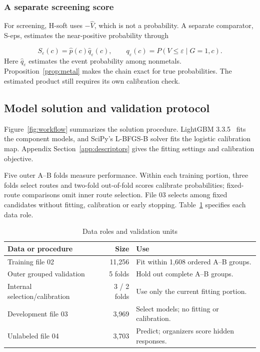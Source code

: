 \subsubsection{A separate screening score}
For screening, H-soft uses $-\widehat V$, which is not a probability. A separate comparator, S-eps, estimates the near-positive probability through
\begin{samepage}
\begin{equation}
 S_{\varepsilon}(c)=\widehat p(c)\widehat q_{\varepsilon}(c),
 \qquad q_{\varepsilon}(c)=P(V\le\varepsilon\mid G=1,c).
 \label{eq:chain}
\end{equation}
\noindent Here $\widehat q_{\varepsilon}$ estimates the event probability among nonmetals. Proposition~\ref{prop:metal} makes the chain exact for true probabilities. The estimated product still requires its own calibration check.
\end{samepage}

\subsection{Model solution and validation protocol}
Figure~\ref{fig:workflow} summarizes the solution procedure. LightGBM 3.3.5~\cite{ke2017} fits the component models, and SciPy's L-BFGS-B solver fits the logistic calibration map. Appendix Section~\ref{app:descriptors} gives the fitting settings and calibration objective.
\FloatBarrier

Five outer A--B folds measure performance. Within each training portion, three folds select routes and two-fold out-of-fold scores calibrate probabilities; fixed-route comparisons omit inner route selection. File 03 selects among fixed candidates without fitting, calibration or early stopping. Table~\ref{tab:protocol} specifies each data role.

\par
\begin{table}[H]
\centering
\begin{threeparttable}
\caption{Data roles and validation units}\label{tab:protocol}
\begin{tabularx}{\linewidth}{@{}l r X@{}}
\toprule
Data or procedure & Size & Use\\
\midrule
Training file 02 & 11,256 & Fit within 1,608 ordered A--B groups.\\
Outer grouped validation & 5 folds & Hold out complete A--B groups.\\
Internal selection/calibration & 3 / 2 folds & Use only the current fitting portion.\\
Development file 03 & 3,969 & Select models; no fitting or calibration.\\
Unlabeled file 04 & 3,703 & Predict; organizers score hidden responses.\\
\bottomrule
\end{tabularx}
\end{threeparttable}
\end{table}
\par

